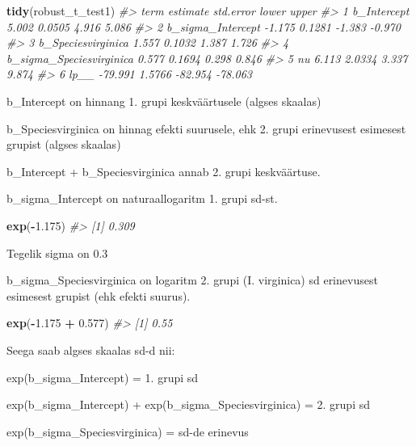 \documentclass[]{book}
\newenvironment{Shaded}{\begin{snugshade}}{\end{snugshade}}
\newcommand{\KeywordTok}[1]{\textcolor[rgb]{0.13,0.29,0.53}{\textbf{#1}}}
\newcommand{\FloatTok}[1]{\textcolor[rgb]{0.00,0.00,0.81}{#1}}
\newcommand{\StringTok}[1]{\textcolor[rgb]{0.31,0.60,0.02}{#1}}
\newcommand{\CommentTok}[1]{\textcolor[rgb]{0.56,0.35,0.01}{\textit{#1}}}
\newcommand{\OperatorTok}[1]{\textcolor[rgb]{0.81,0.36,0.00}{\textbf{#1}}}
\newcommand{\NormalTok}[1]{#1}
\begin{document}
\begin{Shaded}
\begin{Highlighting}[]
\KeywordTok{tidy}\NormalTok{(robust_t_test1)}
\CommentTok{#>                       term estimate std.error   lower   upper}
\CommentTok{#> 1              b_Intercept    5.002    0.0505   4.916   5.086}
\CommentTok{#> 2        b_sigma_Intercept   -1.175    0.1281  -1.383  -0.970}
\CommentTok{#> 3       b_Speciesvirginica    1.557    0.1032   1.387   1.726}
\CommentTok{#> 4 b_sigma_Speciesvirginica    0.577    0.1694   0.298   0.846}
\CommentTok{#> 5                       nu    6.113    2.0334   3.337   9.874}
\CommentTok{#> 6                     lp__  -79.991    1.5766 -82.954 -78.063}
\end{Highlighting}
\end{Shaded}

b\_Intercept on hinnang 1. grupi keskväärtusele (algses skaalas)

b\_Speciesvirginica on hinnag efekti suurusele, ehk 2. grupi erinevusest
esimesest grupist (algses skaalas)

b\_Intercept + b\_Speciesvirginica annab 2. grupi keskväärtuse.

b\_sigma\_Intercept on naturaallogaritm 1. grupi sd-st.

\begin{Shaded}
\begin{Highlighting}[]
\KeywordTok{exp}\NormalTok{(}\OperatorTok{-}\FloatTok{1.175}\NormalTok{)}
\CommentTok{#> [1] 0.309}
\end{Highlighting}
\end{Shaded}

Tegelik sigma on 0.3

b\_sigma\_Speciesvirginica on logaritm 2. grupi (I. virginica) sd
erinevusest esimesest grupist (ehk efekti suurus).

\begin{Shaded}
\begin{Highlighting}[]
\KeywordTok{exp}\NormalTok{(}\OperatorTok{-}\FloatTok{1.175} \OperatorTok{+}\StringTok{ }\FloatTok{0.577}\NormalTok{)}
\CommentTok{#> [1] 0.55}
\end{Highlighting}
\end{Shaded}

Seega saab algses skaalas sd-d nii:

exp(b\_sigma\_Intercept) = 1. grupi sd

exp(b\_sigma\_Intercept) + exp(b\_sigma\_Speciesvirginica) = 2. grupi sd

exp(b\_sigma\_Speciesvirginica) = sd-de erinevus
\end{document}
